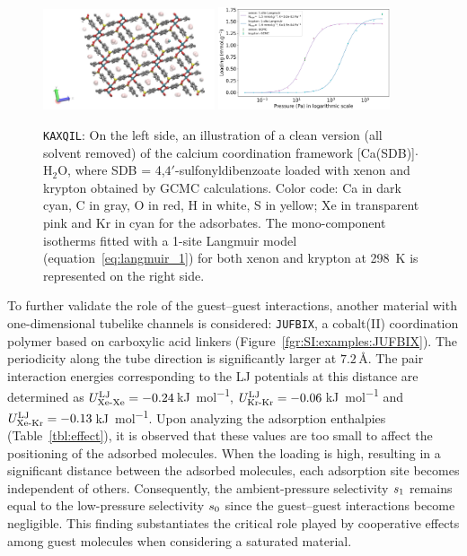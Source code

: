 \documentclass[main.tex]{subfiles}
\begin{document}
\begin{figure}[ht]
  \centering
    \includegraphics[width=0.45\textwidth]{figures/2-thermo/KAXQIL_clean.jpg}
    \includegraphics[width=0.45\textwidth]{figures/2-thermo/KAXQIL_clean_isotherm_xenon_krypton_298K.jpg}
    \caption{\texttt{KAXQIL}: On the left side, an illustration of a clean version (all solvent removed) of the calcium coordination framework [Ca(SDB)]$\cdot$H$_2$O, where SDB = 4,$4'$-sulfonyldibenzoate loaded with xenon and krypton obtained by GCMC calculations. Color code: Ca in dark cyan, C in gray, O in red, H in white, S in yellow; Xe in transparent pink and Kr in cyan for the adsorbates. The mono-component isotherms fitted with a 1-site Langmuir model (equation~\ref{eq:langmuir_1}) for both xenon and krypton at \SI{298}{\kelvin} is represented on the right side.}\label{fgr:SI:examples:KAXQIL}
  \end{figure}

To further validate the role of the guest--guest interactions, another material with one-dimensional tubelike channels is considered: \texttt{JUFBIX}, a cobalt(II) coordination polymer based on carboxylic acid linkers (Figure~\ref{fgr:SI:examples:JUFBIX}).\autocite{JUFBIX} The periodicity along the tube direction is significantly larger at $7.2$\,\si{\angstrom}. The pair interaction energies corresponding to the LJ potentials at this distance are determined as $U^{\text{LJ}}_{\text{Xe-Xe}}=-0.24$\,\si{\kilo\joule\per\mol}, $U^{\text{LJ}}_{\text{Kr-Kr}}=-0.06$\,\si{\kilo\joule\per\mol} and $U^{\text{LJ}}_{\text{Xe-Kr}}=-0.13$\,\si{\kilo\joule\per\mol}. Upon analyzing the adsorption enthalpies (Table~\ref{tbl:effect}), it is observed that these values are too small to affect the positioning of the adsorbed molecules. When the loading is high, resulting in a significant distance between the adsorbed molecules, each adsorption site becomes independent of others. Consequently, the ambient-pressure selectivity $s_{\text{1}}$ remains equal to the low-pressure selectivity $s_{\text{0}}$ since the guest--guest interactions become negligible. This finding substantiates the critical role played by cooperative effects among guest molecules when considering a saturated material.
\end{document}
